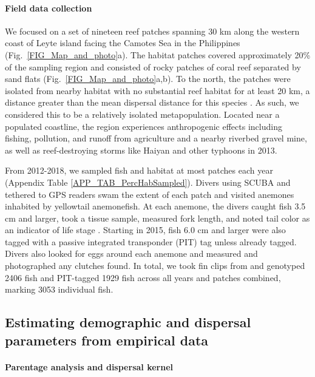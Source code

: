 \documentclass[12pt, oneside]{article}   	%
\begin{document}
\paragraph*{Field data collection}

We focused on a set of nineteen reef patches spanning 30 km along the western coast of Leyte island facing the Camotes Sea in the Philippines (Fig.\ \ref{FIG_Map_and_photo}a). The habitat patches covered approximately 20\% of the sampling region and consisted of rocky patches of coral reef separated by sand flats (Fig.\ \ref{FIG_Map_and_photo}a,b). To the north, the patches were isolated from nearby habitat with no substantial reef habitat for at least 20 km, a distance greater than the mean dispersal distance for this species \citep{pinsky2010using}. As such, we considered this to be a relatively isolated metapopulation. Located near a populated coastline, the region experiences anthropogenic effects including fishing, pollution, and runoff from agriculture and a nearby riverbed gravel mine, as well as reef-destroying storms like Haiyan and other typhoons in 2013.

From 2012-2018, we sampled fish and habitat at most patches each year (Appendix Table \ref{APP_TAB_PercHabSampled}). Divers using SCUBA and tethered to GPS readers swam the extent of each patch and visited anemones inhabited by yellowtail anemonefish. At each anemone, the divers caught fish 3.5 cm and larger, took a tissue sample, measured fork length, and noted tail color as an indicator of life stage \citep{moyer1976geographical}. Starting in 2015, fish 6.0 cm and larger were also tagged with a passive integrated transponder (PIT) tag unless already tagged. Divers also looked for eggs around each anemone and measured and photographed any clutches found. In total, we took fin clips from and genotyped 2406 fish and PIT-tagged 1929 fish across all years and patches combined, marking 3053 individual fish. 

\subsection*{Estimating demographic and dispersal parameters from empirical data} 

\paragraph*{Parentage analysis and dispersal kernel}  
\end{document}
